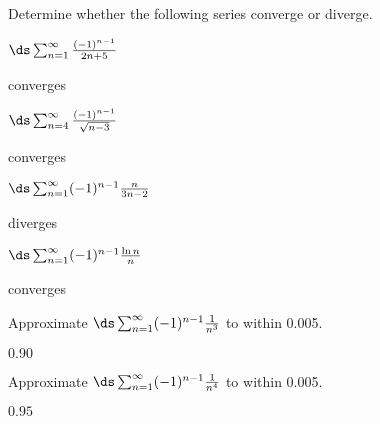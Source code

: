 \begin{enumialphparenastyle}

Determine whether the following series converge or diverge.

\begin{multicols}{2}
\begin{ex}
$\ds\sum_{n=1}^\infty {(-1)^{n-1}\over 2n+5}$
\begin{sol}
converges
\end{sol}
\end{ex}

\begin{ex}
$\ds\sum_{n=4}^\infty {(-1)^{n-1}\over \sqrt{n-3}}$
\begin{sol}
converges
\end{sol}
\end{ex}

\begin{ex}
$\ds\sum_{n=1}^\infty (-1)^{n-1}{n\over 3n-2}$
\begin{sol}
diverges
\end{sol}
\end{ex}

\begin{ex}
$\ds\sum_{n=1}^\infty (-1)^{n-1}{\ln n\over n}$
\begin{sol}
converges
\end{sol}
\end{ex}

\end{multicols}

\begin{ex}
Approximate $\ds\sum_{n=1}^\infty (-1)^{n-1}{1\over n^3}$ to within 0.005.
\begin{sol}
$0.90$
\end{sol}
\end{ex}

\begin{ex}
Approximate $\ds\sum_{n=1}^\infty (-1)^{n-1}{1\over n^4}$ to within 0.005. 
\begin{sol}
$0.95$
\end{sol}
\end{ex}

\end{enumialphparenastyle}